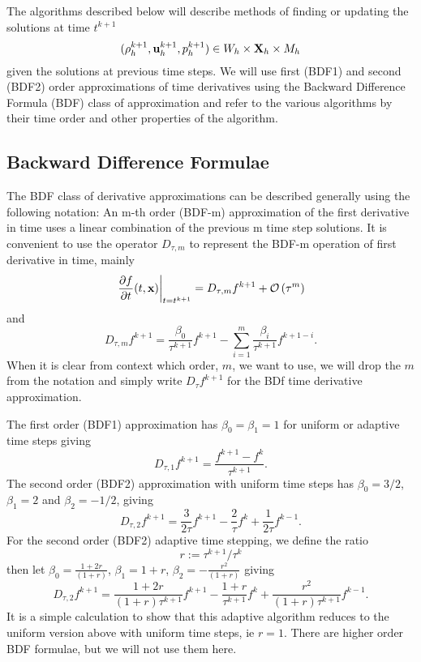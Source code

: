 \documentclass[letterpaper]{erdc}
\begin{document}
The algorithms described below will describe methods of finding or updating the solutions at time $t^{k+1}$
\begin{equation}(\rho^{k+1}_h, \textbf{u}^{k+1}_{h}, p^{k+1}_h) \in W_h\times\textbf{X}_h\times M_h  \end{equation}
given the solutions at previous time steps.  We will use first (BDF1) and second (BDF2) order approximations of time derivatives using the Backward Difference Formula (BDF) class of approximation and refer to the various algorithms by their time order and other properties of the algorithm.

%
%
\subsection{Backward Difference Formulae}
The BDF class of derivative approximations can be described generally using the following notation: An m-th order (BDF-m) approximation of the first derivative in time  uses a linear combination of the previous m time step solutions. It is convenient to use the operator $D_{\tau,m}$ to represent the BDF-m operation of first derivative in time, mainly
\begin{equation}
 \left.\frac{\partial f}{\partial t}(t,\textbf{x})\right|_{t=t^{k+1}} =  D_{\tau,m}f^{k+1} + \mathcal{O}\left(\tau^m\right)
\end{equation}
and
\begin{equation}
  D_{\tau,m}f^{k+1} =  \frac{\beta_0}{\tau^{k+1}}f^{k+1} - \displaystyle\sum_{i=1}^{m} \frac{\beta_{i}}{\tau^{k+1}} f^{k+1-i}.
\end{equation}
When it is clear from context which order, $m$, we want to use, we will drop the $m$ from the notation and simply write $D_{\tau}f^{k+1}$ for the BDf time derivative approximation.


The first order (BDF1) approximation has $\beta_0 = \beta_1 = 1$ for uniform or adaptive time steps giving
\begin{equation}
  D_{\tau,1} f^{k+1} = \frac{f^{k+1} - f^{k}}{\tau^{k+1}}.
\end{equation}
The second order (BDF2) approximation with uniform time steps has $\beta_0 = 3/2$, $\beta_1 = 2$ and $\beta_2 = -1/2$, giving
\begin{equation}  
  D_{\tau,2} f^{k+1} = \frac{3}{2\tau}f^{k+1} - \frac{2}{\tau}f^{k} + \frac{1}{2\tau}f^{k-1}.
\end{equation}
For the second order (BDF2) adaptive time stepping, we define the ratio
\begin{equation}
  r:=\tau^{k+1}/\tau^{k}
\end{equation}
then let $\beta_0 = \frac{1+2r}{(1+r)}$, $\beta_1 = 1+r$, $\beta_2 = -\frac{r^2}{(1+r)}$ giving
\begin{equation} \label{eq:bdf2withvariabletimestep} 
  D_{\tau,2} f^{k+1} = \frac{1+2r}{(1+r)\tau^{k+1}}f^{k+1} - \frac{1+r}{\tau^{k+1}}f^{k} + \frac{r^2}{(1+r)\tau^{k+1}}f^{k-1}.
\end{equation}
It is a simple calculation to show that this adaptive algorithm reduces to the uniform version above with uniform time steps, ie $r=1$.  There are higher order BDF formulae, but we will not use them here.
\end{document}
